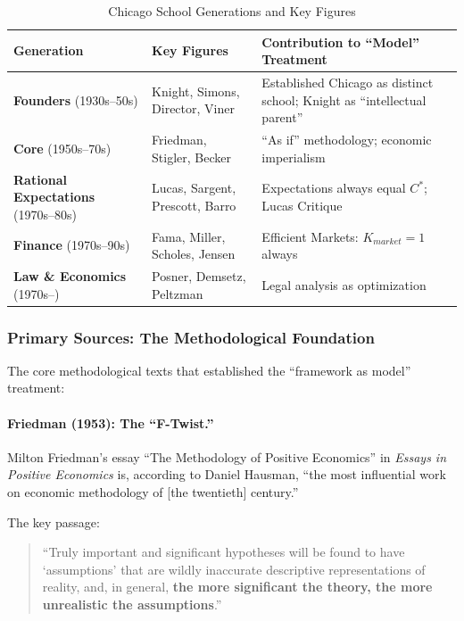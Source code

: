 \begin{table}[htbp]
\centering
\caption{Chicago School Generations and Key Figures}
\label{tab:chicago-generations}
\renewcommand{\arraystretch}{1.3}
\small
\begin{tabular}{@{}llp{6cm}@{}}
\toprule
\textbf{Generation} & \textbf{Key Figures} & \textbf{Contribution to ``Model'' Treatment} \\
\midrule
\textbf{Founders} (1930s--50s) & Knight, Simons, Director, Viner &
    Established Chicago as distinct school; Knight as ``intellectual parent'' \citep{medema2023chicago} \\
\textbf{Core} (1950s--70s) & Friedman, Stigler, Becker &
    ``As if'' methodology; economic imperialism \\
\textbf{Rational Expectations} (1970s--80s) & Lucas, Sargent, Prescott, Barro &
    Expectations always equal $C^*$; Lucas Critique \\
\textbf{Finance} (1970s--90s) & Fama, Miller, Scholes, Jensen &
    Efficient Markets: $K_{market} = 1$ always \\
\textbf{Law \& Economics} (1970s--) & Posner, Demsetz, Peltzman &
    Legal analysis as optimization \\
\bottomrule
\end{tabular}
\end{table}

\subsubsection{Primary Sources: The Methodological Foundation}

The core methodological texts that established the ``framework as model'' treatment:

\paragraph{Friedman (1953): The ``F-Twist.''}
Milton Friedman's essay ``The Methodology of Positive Economics'' in \textit{Essays in
Positive Economics} \citep{friedman1953} is, according to Daniel Hausman, ``the most
influential work on economic methodology of [the twentieth] century.''

The key passage:
\begin{quote}
``Truly important and significant hypotheses will be found to have `assumptions' that
are wildly inaccurate descriptive representations of reality, and, in general,
\textbf{the more significant the theory, the more unrealistic the assumptions}.''
\end{quote}

